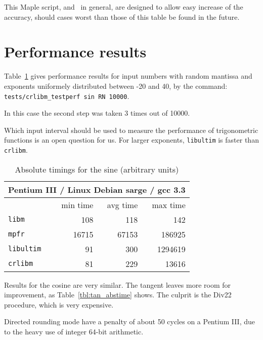 This Maple script, and \crlibm\ in general, are designed to allow easy
increase of the accuracy, should cases worst than those of this table
be found in the future.


\section{Performance results}

Table~\ref{tbl:sine_abstime} gives performance results for input numbers with random
mantissa and exponents uniformely distributed between -20 and 40, by the command:\\
\verb!tests/crlibm_testperf sin RN 10000!.

In this case the second step was taken 3 times out of 10000.

Which input interval should be used to measure the performance of
trigonometric functions is an open question for us. For larger
exponents, \texttt{libultim} is faster than \texttt{crlibm}.

\begin{table}[!htb]
\begin{center}
\renewcommand{\arraystretch}{1.2}
\begin{tabular}{|l|r|r|r|}
\hline
 \multicolumn{4}{|c|}{Pentium III / Linux Debian sarge / gcc 3.3}   \\
 \hline
                        & min time       & avg time     & max time        \\
 \hline
 \texttt{libm}          & 108           &        118    & 142      \\
 \hline
 \texttt{mpfr}          & 16715         &      67153    & 186925      \\
 \hline
 \texttt{libultim}      & 91            &        300    & 1294619      \\
 \hline
\texttt{crlibm}         & 81            &        229    & 13616      \\
 \hline
\end{tabular}
\end{center}
\caption{Absolute timings for the sine (arbitrary units)
  \label{tbl:sine_abstime}}
\end{table}

Results for the cosine are very similar. The tangent leaves more room
for improvement, as Table~\ref{tbl:tan_abstime} shows. The culprit is
the Div22 procedure, which is very expensive.

Directed rounding mode have a penalty of about 50 cycles on a Pentium
III, due to the heavy use of integer 64-bit arithmetic.

